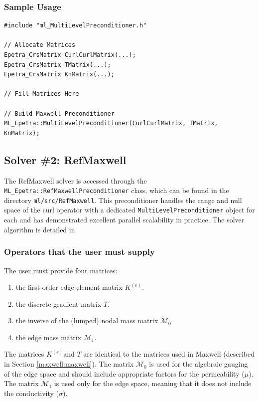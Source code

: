 \documentclass{article}[11pt]
\newcommand{\be}  {\begin{enumerate}}
\newcommand{\ee}  {\end{enumerate}}
\newcommand \Ke {\ensuremath{K^{(e)}}}
\begin{document}
\subsubsection{Sample Usage}\label{maxwell:maxwell example}
\begin{verbatim}
#include "ml_MultiLevelPreconditioner.h"

// Allocate Matrices
Epetra_CrsMatrix CurlCurlMatrix(...);
Epetra_CrsMatrix TMatrix(...);
Epetra_CrsMatrix KnMatrix(...);

// Fill Matrices Here

// Build Maxwell Preconditioner
ML_Epetra::MultiLevelPreconditioner(CurlCurlMatrix, TMatrix, KnMatrix);
\end{verbatim}


\subsection{Solver \#2: RefMaxwell}\label{maxwell:refmaxwell}

The RefMaxwell solver is accessed through the
{\tt ML\_Epetra::RefMaxwellPreconditioner} class, which can be found in the
directory {\tt ml/src/RefMaxwell}.  This preconditioner handles the
range and null space of the curl operator with a dedicated
{\tt MultiLevelPreconditioner} object for each and has demonstrated
excellent parallel scalability in practice. The solver algorithm is
detailed in \cite{BHST_2007}

\subsubsection{Operators that the user must supply}
The user must provide four matrices:
\be
\item the first-order edge element matrix \Ke.
\item the discrete gradient matrix $T$.
\item the inverse of the (lumped) nodal mass matrix $\mathcal{M}_0$.
\item the edge mass matrix $\mathcal{M}_1$.
\ee

The matrices \Ke and $T$ are identical to the matrices used in Maxwell
(described in Section \ref{maxwell:maxwell}).  The matrix
$\mathcal{M}_0$ is used for the algebraic gauging of the edge space
and should include appropriate factors for the permeability ($\mu$).
The matrix $\mathcal{M}_1$ is used only for the edge space, meaning
that it does not include the conductivity ($\sigma$).
\end{document}
